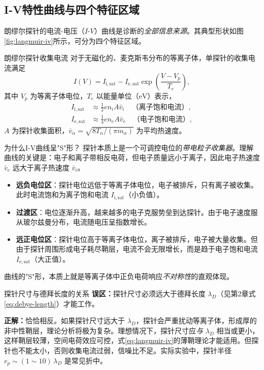 \subsection{I-V特性曲线与四个特征区域}

朗缪尔探针的电流-电压（$I$-$V$）曲线是诊断的\emph{全部信息来源}。其典型形状如图\ref{fig:langmuir-iv}所示，可分为四个特征区域。

\begin{theorem}{朗缪尔探针收集电流}{}{}
对于无磁化的、麦克斯韦分布的等离子体，单探针的收集电流满足
\begin{equation}
I(V) = I_{\mathrm{i,sat}} - I_{\mathrm{e,sat}}\exp\!\left(\frac{V - V_p}{T_e}\right),
\label{eq:langmuir-iv}
\end{equation}
其中 $V_p$ 为等离子体电位，$T_e$ 以能量单位（$\mathrm{eV}$）表示，
\begin{align}
I_{\mathrm{i,sat}} &\approx \frac{1}{2} e n_i A \bar{v}_i \quad \text{（离子饱和电流）},
\label{eq:ion-sat}\\
I_{\mathrm{e,sat}} &\approx \frac{1}{4} e n_e A \bar{v}_e \quad \text{（电子饱和电流）},
\label{eq:elec-sat}
\end{align}
$A$ 为探针收集面积，$\bar{v}_\alpha = \sqrt{8 T_\alpha / (\pi m_\alpha)}$ 为平均热速度。
\end{theorem}

\begin{insight}{为什么I-V曲线呈"S"形？}{}{}
探针本质上是一个可调控电位的\emph{带电粒子收集器}。理解曲线的关键是：电子和离子带相反电荷，但电子质量远小于离子，因此电子热速度 $\bar{v}_e$ 远大于离子热速度 $\bar{v}_i$。

\begin{itemize}
    \item \textbf{远负电位区}：探针电位远低于等离子体电位，电子被排斥，只有离子被收集。此时电流饱和为离子饱和电流 $I_{\mathrm{i,sat}}$（小负值）。
    \item \textbf{过渡区}：电位逐渐升高，越来越多的电子克服势垒到达探针。由于电子速度服从玻尔兹曼分布，电流随电压呈指数增长。
    \item \textbf{远正电位区}：探针电位高于等离子体电位，离子被排斥，电子被大量收集。但由于探针周围形成电子耗尽鞘层，电流不会无限增长，而是趋于电子饱和电流 $I_{\mathrm{e,sat}}$（大正值）。
\end{itemize}

曲线的"S"形，本质上就是等离子体中正负电荷响应\emph{不对称性}的直观体现。
\end{insight}

\begin{warning}{探针尺寸与德拜长度的关系}{}{}
\textbf{误区：}探针尺寸必须远大于德拜长度 $\lambda_D$（见第2章式\eqref{eq:debye-length}）才能工作。

\textbf{正解：}恰恰相反。如果探针尺寸远大于 $\lambda_D$，探针会严重扰动等离子体，形成厚的非中性鞘层，理论分析将极为复杂。理想情况下，探针尺寸应\emph{与} $\lambda_D$ 相当或更小，这样鞘层较薄，空间电荷效应可控，式\eqref{eq:langmuir-iv}的薄鞘理论才能适用。但探针也不能太小，否则收集电流过弱，信噪比不足。实际实验中，探针半径 $r_p \sim (1\sim 10)\,\lambda_D$ 是常见折中。
\end{warning}

